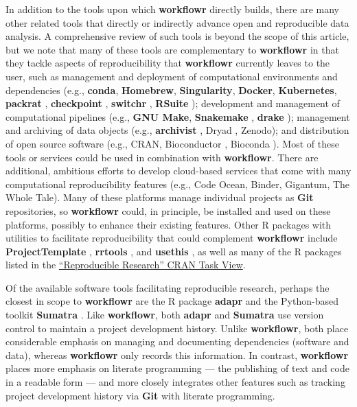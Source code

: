 \documentclass[9pt,a4paper]{extarticle}
\begin{document}
In addition to the tools upon which \textbf{workflowr} directly builds, there are
many other related tools that directly or indirectly advance open and
reproducible data analysis. A comprehensive review of such tools is
beyond the scope of this article, but we note that many of these tools
are complementary to \textbf{workflowr} in that they tackle aspects of
reproducibility that \textbf{workflowr} currently leaves to the user, such as
management and deployment of computational environments and dependencies
(e.g., \textbf{conda}, \textbf{Homebrew}, \textbf{Singularity}, \textbf{Docker}, \textbf{Kubernetes}, \textbf{packrat}
\cite{packrat}, \textbf{checkpoint} \cite{checkpoint}, \textbf{switchr} \cite{switchr},
 \textbf{RSuite} \cite{rsuite}); development and management of computational
pipelines (e.g., \textbf{GNU Make}, \textbf{Snakemake} \cite{snakemake}, \textbf{drake}
\cite{drake}); management and archiving of data objects (e.g., \textbf{archivist}
\cite{archivist}, Dryad \cite{dryad}, Zenodo); and distribution of open
source software (e.g., CRAN, Bioconductor \cite{bioconductor}, Bioconda
\cite{bioconda}). Most of these tools or services could be used in
combination with \textbf{workflowr}. There are additional, ambitious efforts to
develop cloud-based services that come with many computational
reproducibility features (e.g., Code Ocean, Binder, Gigantum, The Whole
Tale). Many of these platforms manage individual projects as \textbf{Git}
repositories, so \textbf{workflowr} could, in principle, be installed and used on
these platforms, possibly to enhance their existing features. Other R
packages with utilities to facilitate reproducibility that could
complement \textbf{workflowr} include \textbf{ProjectTemplate} \cite{projecttemplate},
 \textbf{rrtools} \cite{rrtools}, and \textbf{usethis} \cite{usethis}, as well as many of
the R packages listed in the
\href{https://CRAN.R-project.org/view=ReproducibleResearch}{``Reproducible
Research'' CRAN Task View}.

Of the available software tools facilitating reproducible research,
perhaps the closest in scope to \textbf{workflowr} are the R package \textbf{adapr}
\cite{Gelfond2018} and the Python-based toolkit \textbf{Sumatra}
\cite{Davidson2014}. Like \textbf{workflowr}, both \textbf{adapr} and \textbf{Sumatra} use version
control to maintain a project development history. Unlike \textbf{workflowr},
both place considerable emphasis on managing and documenting
dependencies (software and data), whereas \textbf{workflowr} only records this
information. In contrast, \textbf{workflowr} places more emphasis on literate
programming --- the publishing of text and code in a readable form ---
and more closely integrates other features such as tracking project
development history via \textbf{Git} with literate programming.
\end{document}
